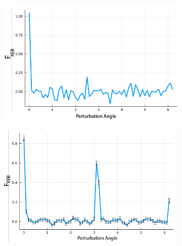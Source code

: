 \documentclass[12pt]{article}
\begin{document}
\begin{figure}
	\centering
	\begin{subfigure}[t]{0.42\textwidth}
		\centering
		\includegraphics[width=\linewidth]
		{figures/Task4}
		\subcaption{\label{fig:task4}}
	\end{subfigure}%
	\begin{subfigure}[t]{0.42\textwidth}
		\centering
		\includegraphics[width=\linewidth]
		{figures/Task4b_N_4_d_128_s_200_fg}
		\subcaption{\label{fig:task4b_N4}}
	\end{subfigure}%
	

\end{figure}
\end{document}
